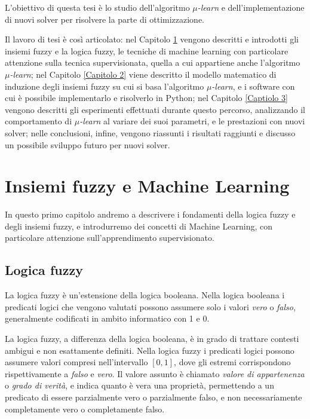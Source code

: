 \documentclass[a4paper,12pt]{report}
\begin{document}
L'obiettivo di questa tesi è lo studio dell'algoritmo \textit{$\mu$-learn} e dell'implementazione di nuovi solver per risolvere la parte di ottimizzazione.

Il lavoro di tesi è così articolato: nel Capitolo \ref{Capitolo 1} vengono descritti e introdotti gli insiemi fuzzy e la logica fuzzy, le tecniche di machine learning con particolare attenzione sulla tecnica supervisionata, quella a cui appartiene anche l'algoritmo \textit{$\mu$-learn}; nel Capitolo \ref{Capitolo 2} viene descritto il modello matematico di induzione degli insiemi fuzzy su cui si basa l'algoritmo \textit{$\mu$-learn}, e i software con cui è possibile implementarlo e risolverlo in Python; nel Capitolo \ref{Captiolo 3} vengono descritti gli esperimenti effettuati durante questo percorso, analizzando il comportamento di \textit{$\mu$-learn} al variare dei suoi parametri, e le prestazioni con nuovi solver; nelle conclusioni, infine, vengono riassunti i risultati raggiunti e discusso un possibile sviluppo futuro per nuovi solver.


\chapter{Insiemi fuzzy e Machine Learning}
\label{Capitolo 1}
In questo primo capitolo andremo a descrivere i fondamenti della logica fuzzy e degli insiemi fuzzy, e introdurremo dei concetti di Machine Learning, con particolare attenzione sull'apprendimento supervisionato.

\section{Logica fuzzy}
La logica fuzzy \cite{logica_fuzzy} è un'estensione della logica booleana.
Nella logica booleana i predicati logici che vengono valutati possono assumere solo i valori \textit{vero} o \textit{falso}, generalmente codificati in ambito informatico con 1 e 0.


La logica fuzzy, a differenza della logica booleana, è in grado di trattare contesti ambigui e non esattamente definiti.
Nella logica fuzzy i predicati logici possono assumere valori compresi nell'intervallo $[0,1]$, dove gli estremi corrispondono rispettivamente a \textit{falso} e \textit{vero}.
Il valore assunto è chiamato \textit{valore di appartenenza} o \textit{grado di verità}, e indica quanto è vera una proprietà, permettendo a un predicato di essere parzialmente vero o parzialmente falso, e non necessariamente completamente vero o completamente falso.
\end{document}

